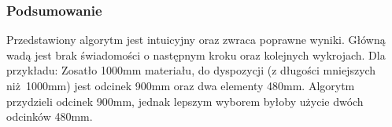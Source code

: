 \subsubsection{Podsumowanie}
Przedstawiony algorytm jest intuicyjny oraz zwraca poprawne wyniki. Główną wadą jest brak świadomości o następnym kroku oraz kolejnych wykrojach. Dla przykładu: Zosatło 1000mm materiału, do dyspozycji (z długości mniejszych niż 1000mm) jest odcinek 900mm oraz dwa elementy 480mm. Algorytm przydzieli odcinek 900mm, jednak lepszym wyborem byłoby użycie dwóch odcinków 480mm.
